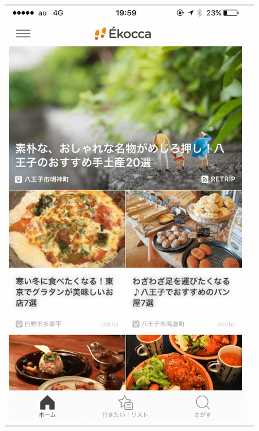 \documentclass[a4paper]{jsarticle}
\begin{document}
\begin{enumerate}
\begin{enumerate}
\fifigure
\begin{figure}[H]
  \begin{center}
    \begin{tabular}{cc}
    \begin{minipage}{0.35\hsize}
	\includegraphics[width=\hsize]{./images/curation_home.png}
    \end{minipage}
    &
    \begin{minipage}{0.35\hsize}

\end{minipage}
\end{tabular}
\end{center}
\end{figure}
\end{enumerate}
\end{enumerate}
\end{document}
